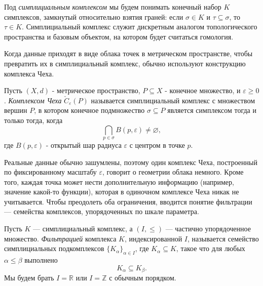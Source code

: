 Под \emph{симплициальным комплексом} мы будем понимать конечный набор $K$ симплексов, замкнутый относительно взятия граней: если $\sigma \in K$ и $\tau \subseteq \sigma$, то $\tau \in K$. Симплициальный комплекс служит дискретным аналогом топологического пространства и базовым объектом, на котором будет считаться гомология.

Когда данные приходят в виде облака точек в метрическом пространстве, чтобы превратить их в симплициальный комплекс, обычно используют конструкцию комплекса Чеха.
\begin{definition}
Пусть $(X, d)$ - метрическое пространство, $P \subseteq X$ - конечное множество, и $\varepsilon \ge 0$.
\emph{Комплексом Чеха} $\check{C}_{\varepsilon}(P)$ называется симплициальный комплекс с множеством вершин $P$, в котором
конечное подмножество $\sigma\subseteq P$ является симплексом тогда и только тогда, когда
\[
\bigcap_{p\in \sigma} B(p, \varepsilon) \neq \varnothing,
\]
где $B(p, \varepsilon)$ - открытый шар радиуса $\varepsilon$ с центром в точке $p$.
\end{definition}

Реальные данные обычно зашумлены, поэтому один комплекс Чеха, построенный по фиксированному масштабу $\varepsilon$, говорит о геометрии облака немного. Кроме того, каждая точка может нести дополнительную информацию (например, значение какой-то функции), которая в одиночном комплексе Чеха никак не учитывается. Чтобы преодолеть оба ограничения, вводится понятие фильтрации --- семейства комплексов, упорядоченных по шкале параметра.
\begin{definition}[Фильтрация]
Пусть $K$ --- симплициальный комплекс, а $(I,\le)$ --- частично упорядоченное множество.
\emph{Фильтрацией} комплекса $K$, индексированной $I$, называется семейство симплициальных подкомплексов
$\{K_\alpha\}_{\alpha\in I}$, где $K_\alpha\subseteq K$, такое что для любых $\alpha\le \beta$ выполнено
\[
K_\alpha \subseteq K_\beta.
\]
Мы будем брать $I=\mathbb{R}$ или $I=\mathbb{Z}$ с обычным порядком.
\end{definition}

